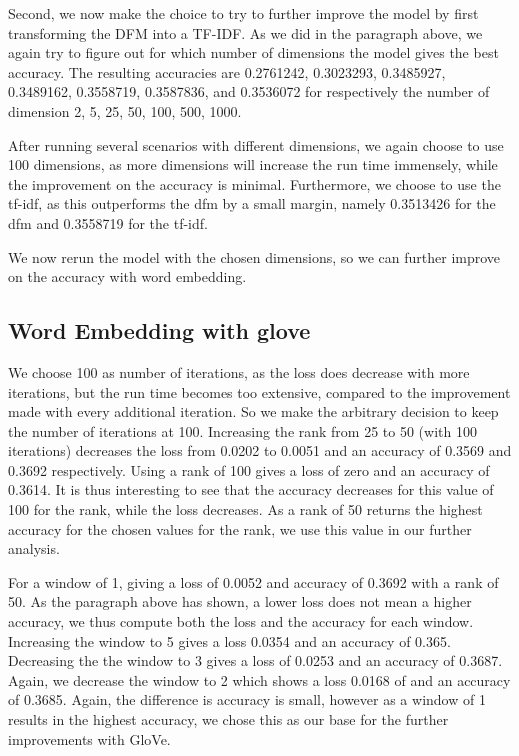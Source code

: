 \documentclass[
]{article}
\begin{document}
Second, we now make the choice to try to further improve the model by
first transforming the DFM into a TF-IDF. As we did in the paragraph
above, we again try to figure out for which number of dimensions the
model gives the best accuracy. The resulting accuracies are 0.2761242,
0.3023293, 0.3485927, 0.3489162, 0.3558719, 0.3587836, and 0.3536072 for
respectively the number of dimension 2, 5, 25, 50, 100, 500, 1000.

After running several scenarios with different dimensions, we again
choose to use 100 dimensions, as more dimensions will increase the run
time immensely, while the improvement on the accuracy is minimal.
Furthermore, we choose to use the tf-idf, as this outperforms the dfm by
a small margin, namely 0.3513426 for the dfm and 0.3558719 for the
tf-idf.

We now rerun the model with the chosen dimensions, so we can further
improve on the accuracy with word embedding.

\hypertarget{word-embedding-with-glove}{%
\subsection{Word Embedding with glove}\label{word-embedding-with-glove}}

We choose 100 as number of iterations, as the loss does decrease with
more iterations, but the run time becomes too extensive, compared to the
improvement made with every additional iteration. So we make the
arbitrary decision to keep the number of iterations at 100. Increasing
the rank from 25 to 50 (with 100 iterations) decreases the loss from
0.0202 to 0.0051 and an accuracy of 0.3569 and 0.3692 respectively.
Using a rank of 100 gives a loss of zero and an accuracy of 0.3614. It
is thus interesting to see that the accuracy decreases for this value of
100 for the rank, while the loss decreases. As a rank of 50 returns the
highest accuracy for the chosen values for the rank, we use this value
in our further analysis.

For a window of 1, giving a loss of 0.0052 and accuracy of 0.3692 with a
rank of 50. As the paragraph above has shown, a lower loss does not mean
a higher accuracy, we thus compute both the loss and the accuracy for
each window. Increasing the window to 5 gives a loss 0.0354 and an
accuracy of 0.365. Decreasing the the window to 3 gives a loss of 0.0253
and an accuracy of 0.3687. Again, we decrease the window to 2 which
shows a loss 0.0168 of and an accuracy of 0.3685. Again, the difference
is accuracy is small, however as a window of 1 results in the highest
accuracy, we chose this as our base for the further improvements with
GloVe.
\end{document}
